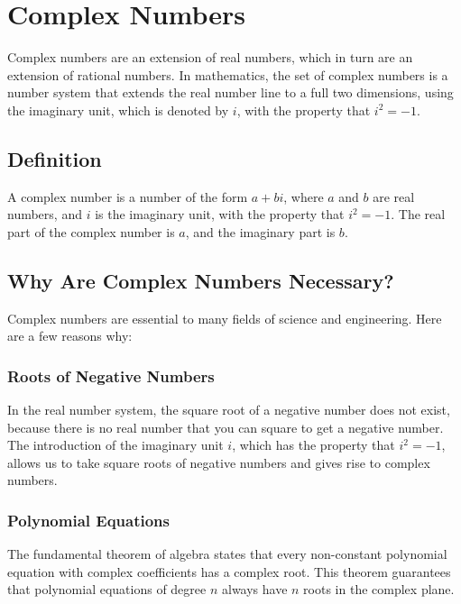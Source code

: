 \chapter{Complex Numbers}

Complex numbers are an extension of real numbers, which in turn
are an extension of rational numbers. In mathematics, the set of
complex numbers is a number system that extends the real number line
to a full two dimensions, using the imaginary unit, which is denoted by
$i$, with the property that $i^2 = -1$.

\section{Definition}

A complex number is a number of the form $a + bi$, where $a$ and $b$
are real numbers, and $i$ is the imaginary unit, with the property
that $i^2 = -1$. The real part of the complex number is $a$, and the
imaginary part is $b$.

\section{Why Are Complex Numbers Necessary?}

Complex numbers are essential to many fields of science and
engineering. Here are a few reasons why:

\subsection{Roots of Negative Numbers}

In the real number system, the square root of a negative number does
not exist, because there is no real number that you can square to get a
negative number. The introduction of the imaginary unit $i$, which has
the property that $i^2 = -1$, allows us to take square roots of
negative numbers and gives rise to complex numbers.

\subsection{Polynomial Equations}

The fundamental theorem of algebra states that every non-constant
polynomial equation with complex coefficients has a complex root. This
theorem guarantees that polynomial equations of degree $n$ always have
$n$ roots in the complex plane.

